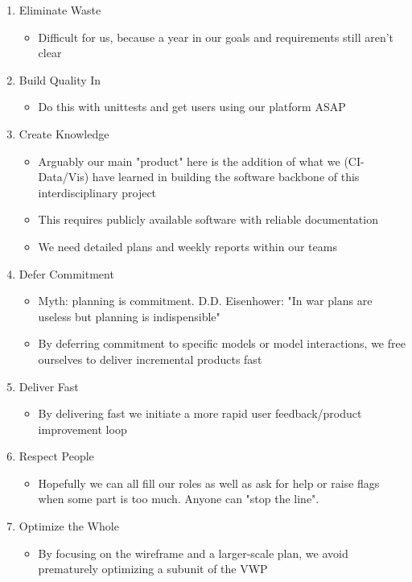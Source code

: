 \documentclass[
11pt, %
a4paper, %
oneside, %
twoside, %
headinclude,footinclude, %
BCOR5mm, %
]{scrartcl}
\begin{document}
\begin{enumerate}
    \item Eliminate Waste
        \begin{itemize}
            \item Difficult for us, because a year in our goals and requirements still aren't clear
        \end{itemize}
    \item Build Quality In
        \begin{itemize}
            \item Do this with unittests and get users using our platform ASAP
        \end{itemize}
    \item Create Knowledge
        \begin{itemize}
            \item Arguably our main "product" here is the addition of what we (CI-Data/Vis) have 
                learned in building the software backbone of this interdisciplinary project
            \item This requires publicly available software with reliable documentation
            \item We need detailed plans and weekly reports within our teams
        \end{itemize}
    \item Defer Commitment
        \begin{itemize}
            \item Myth: planning is commitment. D.D. Eisenhower: "In war plans are useless but 
                planning is indispensible"
            \item By deferring commitment to specific models or model interactions, we free 
                ourselves to deliver incremental products fast
        \end{itemize}
    \item Deliver Fast
        \begin{itemize}
            \item By delivering fast we initiate a more rapid user feedback/product improvement loop
        \end{itemize}
    \item Respect People
        \begin{itemize}
            \item Hopefully we can all fill our roles as well as ask for help or raise flags when
                some part is too much. Anyone can "stop the line".
        \end{itemize}
    \item Optimize the Whole
        \begin{itemize}
            \item By focusing on the wireframe and a larger-scale plan, we avoid prematurely
                optimizing a subunit of the VWP
        \end{itemize}
\end{enumerate}
\end{document}
